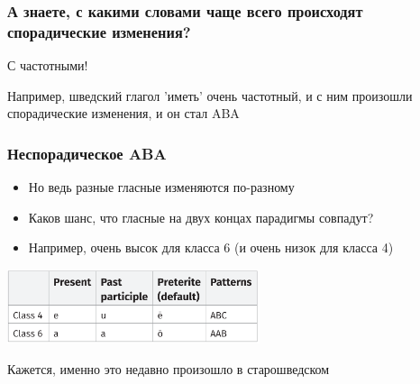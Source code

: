 \documentclass[9pt, t]{beamer}
\begin{document}
\begin{frame}[c]
    \frametitle{А знаете, с какими словами чаще всего происходят спорадические изменения?}

    \pause
    С частотными!

    Например, шведский глагол 'иметь' очень частотный, и с ним произошли спорадические изменения, и он стал ABA

\end{frame}

\begin{frame}
    \frametitle{Неспорадическое ABA}

    \begin{itemize}
        \item Но ведь разные гласные изменяются по-разному
        \pause
        \item Каков шанс, что гласные на двух концах парадигмы совпадут?
        \pause
        \item Например, очень высок для класса 6 (и очень низок для класса 4)
    \end{itemize}
    
    \includegraphics[width=20em]{images/two classes.png}
    
    \pause
    Кажется, именно это недавно произошло в старошведском

\end{frame}
\end{document}
